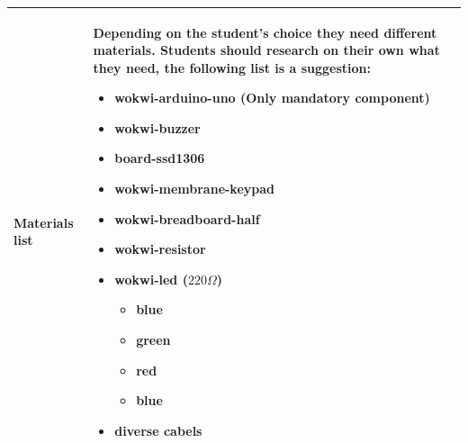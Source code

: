 \documentclass[10pt]{article}
\begin{document}
\begin{longtable}{|p{3.5cm}|p{11cm}|}
  \textbf{Materials list} & 
  Depending on the student's choice they need different materials. Students should research on their own what they need, the following list is a suggestion:
  \begin{itemize}
    \item wokwi-arduino-uno \textbf{(Only mandatory component)}
    \item wokwi-buzzer
    \item board-ssd1306
    \item wokwi-membrane-keypad
    \item wokwi-breadboard-half
    \item wokwi-resistor
    \item wokwi-led ($220 \Omega$)
    \begin{itemize}
      \item blue
      \item green
      \item red
      \item blue
    \end{itemize}
    \item diverse cabels
  \end{itemize}
  \\ \hline
  

\end{longtable}
\end{document}
